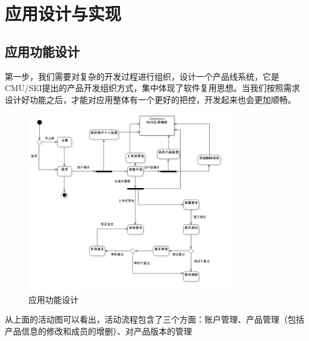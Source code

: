 \chapter{应用设计与实现}
\label{cha:experiment}

\section{应用功能设计}
\label{sec:app_design}
第一步，我们需要对复杂的开发过程进行组织，设计一个产品线系统\cite{Yang}，它是CMU/SEI提出的产品开发组织方式，集中体现了软件复用思想。当我们按照需求设计好功能之后，才能对应用整体有一个更好的把控，开发起来也会更加顺畅。
\begin{figure}[h]
	\centering
	\includegraphics[width=0.8\textwidth]{image/UML/ActivityDiagram.png}
	\caption{应用功能设计}
	\label{fig:app}
\end{figure}
从上面的活动图可以看出，活动流程包含了三个方面：账户管理、产品管理（包括产品信息的修改和成员的增删）、对产品版本的管理
